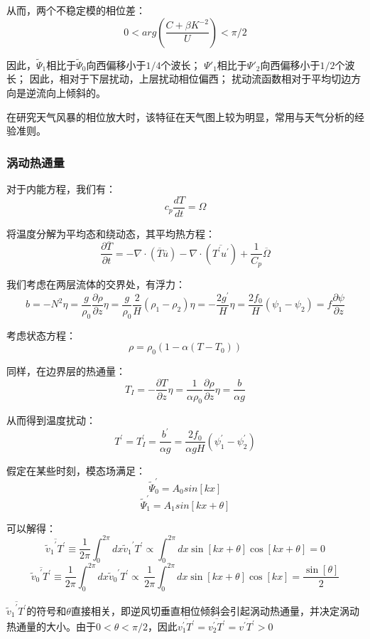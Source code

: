 \documentclass{article}
\begin{document}
从而，两个不稳定模的相位差：
$$0<arg(\frac{C +\beta K^{-2}}{U})<\pi/2$$

因此，$\tilde{\Psi}_1$相比于$\tilde{\Psi}_0$向西偏移小于$1/4$个波长；
$\Psi'_1$相比于$\Psi'_2$向西偏移小于$1/2$个波长；
因此，相对于下层扰动，上层扰动相位偏西；
扰动流函数相对于平均切边方向是逆流向上倾斜的。

在研究天气风暴的相位放大时，该特征在天气图上较为明显，常用与天气分析的经验准则。

\subsubsection{涡动热通量}
对于内能方程，我们有：
$$c_p\frac{dT}{dt}=\Omega$$

将温度分解为平均态和绕动态，其平均热方程：
$$\frac{\partial \overline{T}}{\partial t}=-\nabla \cdot (\overline{T}\overline{u})-\nabla \cdot (\overline{{T}^{\prime}{u}^{\prime}})+\frac{1}{{{C}_{p}}}\overline{\Omega }$$

我们考虑在两层流体的交界处，有浮力：
$$b = -N^2\eta = \frac{g}{\rho_0}\frac{\partial \rho}{\partial z}\eta = \frac{g}{\rho_0}\frac{2}{H}(\rho_1-\rho_2)\eta=-\frac{2g^{\prime}}{H}\eta =\frac{2f_0}{H}(\psi_1-\psi_2)=f\frac{\partial \psi}{\partial z} $$

考虑状态方程：
$$\rho = \rho_0(1-\alpha(T-T_0))$$

同样，在边界层的热通量：
$$T_I = -\frac{\partial T}{\partial z}\eta = \frac{1}{\alpha\rho_0}\frac{\partial \rho}{\partial z}\eta = \frac{b}{\alpha g }$$

从而得到温度扰动：
$$T^{\prime} = T_I^{\prime} = \frac{b^{\prime}}{\alpha g} = \frac{2f_0}{\alpha gH}(\psi_1^{\prime}-\psi_2^{\prime})$$

假定在某些时刻，模态场满足：
$$\tilde{\Psi}_0^{\prime} = A_0sin[kx]$$
$$\tilde{\Psi}_1^{\prime} = A_1sin[kx+\theta]$$

可以解得：
$$\overline{{{\widetilde{v}}_{1}}^{\prime }{T}^{\prime}}\equiv \frac{1}{2\pi }\int_{0}^{2\pi }{dx}{{\widetilde{v}}_{1}}^{\prime }{T}^{\prime}\propto \int_{0}^{2\pi }{dx}\sin [kx+\theta ]\cos [kx+\theta ]=0$$
$$\overline{{{\widetilde{v}}_{0}}^{\prime }{T}^{\prime}}\equiv \frac{1}{2\pi }\int_{0}^{2\pi }{dx}{{\widetilde{v}}_{0}}^{\prime }{T}^{\prime}\overset{}{\mathop{\propto }}\,\frac{1}{2\pi }\int_{0}^{2\pi }{dx}\sin [kx+\theta ]\cos [kx]=\frac{\sin [\theta ]}{2}$$

$\overline{{{\widetilde{v}}_{1}}^{\prime }{T}^{\prime}}$的符号和$\theta$直接相关，即逆风切垂直相位倾斜会引起涡动热通量，并决定涡动热通量的大小。由于$0<\theta<\pi/2$，因此$\overline{v_1^{\prime}T^{\prime}}=\overline{v_2^{\prime}T^{\prime}}=\overline{v^{\prime}T^{\prime}}>0$
\end{document}
